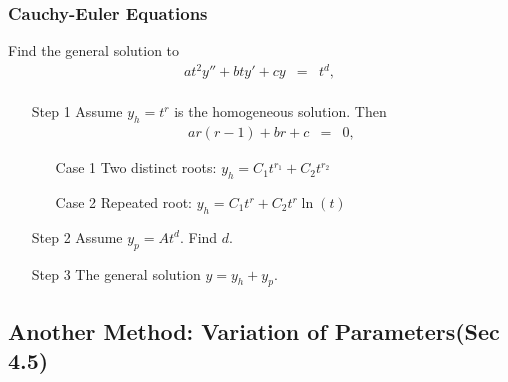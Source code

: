 \begin{frame}
  \frametitle{Cauchy-Euler Equations}

  Find the general solution to
  {\color{red}\begin{eqnarray*}
    a t^2 y''+ bt y' + c y  & = & t^d, \\
  \end{eqnarray*}}

  \begin{enumerate}
    \item[Step 1] Assume {\color{blue}$y_h=t^r$} is the homogeneous solution. Then 
    \begin{eqnarray*}
      ar(r-1) +br + c & = & 0, 
    \end{eqnarray*}
    \vspace{-0.5cm}
    \begin{enumerate}
    \item[Case 1] Two distinct roots:  
           {\color{orange}$y_h=C_1t^{r_1}+C_2t^{r_2}$} 
    \item[Case 2] Repeated root:  
            {\color{orange}$y_h=C_1t^{r}+C_2t^{r}\ln(t)$ }
    \end{enumerate}

    \item[Step 2] Assume {\color{blue}$y_p=At^d$}. Find $d$. 
    \item[Step 3] The general solution {\color{red}$y=y_h+y_p$}. 
   \end{enumerate}
 


\end{frame}


\subsection{Another Method: Variation of Parameters(Sec 4.5)}

